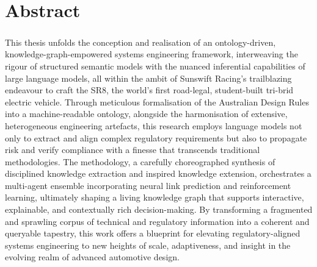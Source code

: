 \chapter*{Abstract}
\label{abstract}
    \paragraph{}
    This thesis unfolds the conception and realisation of an ontology-driven, knowledge-graph-empowered systems engineering framework, interweaving the rigour of structured semantic models with the nuanced inferential capabilities of large language models, all within the ambit of Sunswift Racing’s trailblazing endeavour to craft the SR8, the world’s first road-legal, student-built tri-brid electric vehicle. Through meticulous formalisation of the Australian Design Rules into a machine-readable ontology, alongside the harmonisation of extensive, heterogeneous engineering artefacts, this research employs language models not only to extract and align complex regulatory requirements but also to propagate risk and verify compliance with a finesse that transcends traditional methodologies. The methodology, a carefully choreographed synthesis of disciplined knowledge extraction and inspired knowledge extension, orchestrates a multi-agent ensemble incorporating neural link prediction and reinforcement learning, ultimately shaping a living knowledge graph that supports interactive, explainable, and contextually rich decision-making. By transforming a fragmented and sprawling corpus of technical and regulatory information into a coherent and queryable tapestry, this work offers a blueprint for elevating regulatory-aligned systems engineering to new heights of scale, adaptiveness, and insight in the evolving realm of advanced automotive design.